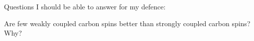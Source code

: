 Questions I should be able to answer for my defence:

Are few weakly coupled carbon spins better than strongly coupled carbon spins? Why?
